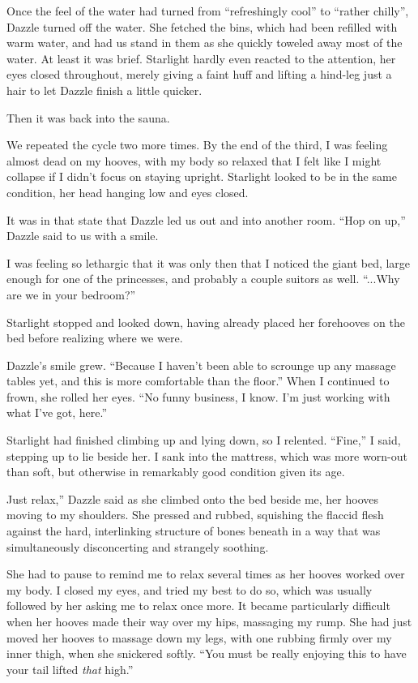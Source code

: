 Once the feel of the water had turned from “refreshingly cool” to “rather chilly”, Dazzle turned off the water. She fetched the bins, which had been refilled with warm water, and had us stand in them as she quickly toweled away most of the water. At least it was brief. Starlight hardly even reacted to the attention, her eyes closed throughout, merely giving a faint huff and lifting a hind-leg just a hair to let Dazzle finish a little quicker.

Then it was back into the sauna.

We repeated the cycle two more times. By the end of the third, I was feeling almost dead on my hooves, with my body so relaxed that I felt like I might collapse if I didn’t focus on staying upright. Starlight looked to be in the same condition, her head hanging low and eyes closed.

It was in that state that Dazzle led us out and into another room. “Hop on up,” Dazzle said to us with a smile.

I was feeling so lethargic that it was only then that I noticed the giant bed, large enough for one of the princesses, and probably a couple suitors as well. “...Why are we in your bedroom?”

Starlight stopped and looked down, having already placed her forehooves on the bed before realizing where we were.

Dazzle’s smile grew. “Because I haven’t been able to scrounge up any massage tables yet, and this is more comfortable than the floor.” When I continued to frown, she rolled her eyes. “No funny business, I know. I’m just working with what I’ve got, here.”

Starlight had finished climbing up and lying down, so I relented. “Fine,” I said, stepping up to lie beside her. I sank into the mattress, which was more worn-out than soft, but otherwise in remarkably good condition given its age.

\leavevmode{}Just relax,” Dazzle said as she climbed onto the bed beside me, her hooves moving to my shoulders. She pressed and rubbed, squishing the flaccid flesh against the hard, interlinking structure of bones beneath in a way that was simultaneously disconcerting and strangely soothing.

She had to pause to remind me to relax several times as her hooves worked over my body. I closed my eyes, and tried my best to do so, which was usually followed by her asking me to relax once more. It became particularly difficult when her hooves made their way over my hips, massaging my rump. She had just moved her hooves to massage down my legs, with one rubbing firmly over my inner thigh, when she snickered softly. “You must be really enjoying this to have your tail lifted \textit{that} high.”

